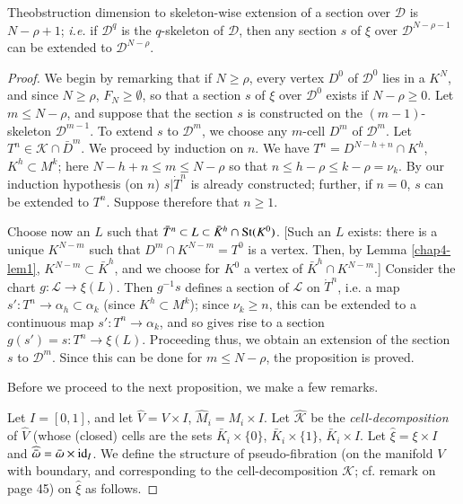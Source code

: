 \setcounter{proposition}{0}
\begin{proposition}\label{chap4-prop1} %
The\pageoriginale obstruction dimension to skeleton-wise extension of
a section over 
$\mathscr{D}$ is $N-\rho+1$; {\em i.e.} if $\mathscr{D}^{q}$ is the
$q$-skeleton of $\mathscr{D}$, then any section $s$ of $\xi$ over
$\mathscr{D}^{N-\rho-1}$ can be extended to $\mathscr{D}^{N-\rho}$. 
\end{proposition}    

\begin{proof} %
We begin by remarking that if $N\geq \rho$, every vertex $D^{0}$ of
$\mathscr{D}^{0}$ lies in a $K^{N}$, and since $N\geq \rho$,
$F_{N}\geq \emptyset$, so that a section $s$ of $\xi$ over
$\mathscr{D}^{0}$ exists if $N-\rho\geq 0$. Let $m\leq N-\rho$, and
suppose that the section $s$ is constructed on the $(m-1)$-skeleton
$\mathscr{D}^{m-1}$. To extend $s$ to $\mathscr{D}^{m}$, we choose any
$m$-cell $D^{m}$ of $\mathscr{D}^{m}$. Let $T^{n}\in \mathscr{K}\cap
\bar{D}^{m}$. We proceed by induction on $n$. We have
$T^{n}=D^{N-h+n}\cap K^{h}$, $K^{h}\subset M^{k}$; here $N-h+n\leq
m\leq N-\rho$ so that $n\leq h-\rho\leq k-\rho=\nu_{k}$. By our
induction hypothesis (on $n$) $s|\dot{T}^{n}$ is already constructed;
further, if $n=0$, $s$ can be extended to $T^{n}$. Suppose therefore
that $n\geq 1$.

Choose now an $L$ such that $\bar{T}^{n}\subset L\subset
\bar{K}^{h}\cap \operatorname{St}(K^{0})$. [Such an $L$ exists: there is a unique
  $K^{N-m}$ such that $D^{m}\cap K^{N-m}=T^{0}$ is a vertex. Then, by
  Lemma \ref{chap4-lem1}, $K^{N-m}\subset \bar{K}^{h}$, and we choose
  for $K^{0}$ a vertex of $\bar{K}^{h}\cap K^{N-m}$.] Consider the
chart $g:\mathscr{L}\to \xi(L)$. Then $g^{-1}s$ defines a section of
$\mathscr{L}$ on $\dot{T}^{n}$, i.e. a map $s':T^{n}\to
\alpha_{h}\subset \alpha_{k}$ (since $K^{h}\subset M^{k}$); since
$\nu_{k}\geq n$, this can be extended to a continuous map $s':T^{n}\to
\alpha_{k}$, and so gives rise to a section $g(s')=s:T^{n}\to
\xi(L)$. Proceeding thus, we obtain an extension of the section $s$ to
$\mathscr{D}^{m}$. Since this can be done for $m\leq N-\rho$, the
proposition is proved.

Before we proceed to the next proposition, we make a few remarks.

Let $I=[0,1]$, and let $\widehat{V}=V\times I$,
$\widehat{M}_{i}=M_{i}\times I$. Let $\widehat{\mathscr{K}}$ be the
{\em cell-decomposition} of $\widehat{V}$ (whose (closed) cells are
the sets $\bar{K}_{i}\times\{0\}$,\pageoriginale
$\bar{K}_{i}\times\{1\}$, $\bar{K}_{i}\times I$. Let
$\widehat{\xi}=\xi\times I$ and
$\widehat{\bar{\omega}}=\bar{\omega}\times \operatorname{id}_{I}$. We define the
structure of pseudo-fibration (on the manifold $V$ with boundary, and
corresponding to the cell-decomposition $\mathscr{K}$; cf. remark on
page 45) on $\widehat{\xi}$ as follows. 


\end{proof}
